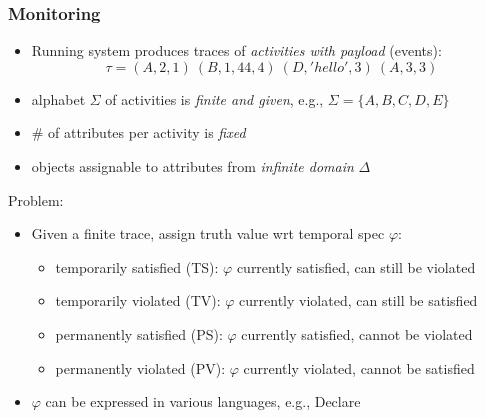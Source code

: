 \documentclass[xcolor=dvipsnames]{beamer}
\begin{document}
\begin{frame}
\frametitle{Monitoring}

\begin{itemize}
	\item Running system produces traces of \emph{activities with payload} (events): 
	$$\tau=(A,2,1)~(B,1,44,4)~(D,'hello',3)~(A,3,3)$$ 
	\item alphabet $\Sigma$ of activities is \emph{finite and given}, e.g., $\Sigma=\{A,B,C,D,E\}$
	\item \# of attributes per activity is \emph{fixed}
	\item objects assignable to attributes from \emph{infinite domain} $\Delta$
\end{itemize}

Problem:
\begin{itemize}
	\item Given a finite trace, assign truth value wrt temporal spec $\varphi$:
		\begin{itemize}
			\item temporarily satisfied (TS): $\varphi$ currently satisfied, can still be violated
			\item temporarily violated (TV): $\varphi$ currently violated, can still be satisfied
			\item permanently satisfied (PS): $\varphi$ currently satisfied, cannot be violated
			\item permanently violated (PV): $\varphi$ currently violated, cannot be satisfied
		\end{itemize}	
		

	\item $\varphi$ can be expressed in various languages, e.g., Declare
\end{itemize}

\end{frame}


\end{document}

